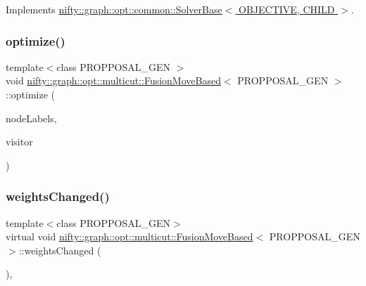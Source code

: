 Implements \hyperlink{classnifty_1_1graph_1_1opt_1_1common_1_1SolverBase_a55e9eb645c07d6e0782ebfb990ab3c84}{nifty\+::graph\+::opt\+::common\+::\+Solver\+Base$<$ O\+B\+J\+E\+C\+T\+I\+V\+E, C\+H\+I\+L\+D $>$}.

\mbox{\label{classnifty_1_1graph_1_1opt_1_1multicut_1_1FusionMoveBased_a4d49383fec48f42f7cba00268e0a59b9}} 
\subsubsection{\texorpdfstring{optimize()}{optimize()}}
{\footnotesize\ttfamily template$<$class P\+R\+O\+P\+P\+O\+S\+A\+L\+\_\+\+G\+EN $>$ \\
void \hyperlink{classnifty_1_1graph_1_1opt_1_1multicut_1_1FusionMoveBased}{nifty\+::graph\+::opt\+::multicut\+::\+Fusion\+Move\+Based}$<$ P\+R\+O\+P\+P\+O\+S\+A\+L\+\_\+\+G\+EN $>$\+::optimize (\begin{DoxyParamCaption}\item[{\hyperlink{classnifty_1_1graph_1_1opt_1_1multicut_1_1FusionMoveBased_aba413de6d17c8728f09126c45e621cdd}{Node\+Labels\+Type} \&}]{node\+Labels,  }\item[{\hyperlink{classnifty_1_1graph_1_1opt_1_1common_1_1SolverBase_ad9932afb08dd17d375de4b15da9ffaa6}{Visitor\+Base\+Type} $\ast$}]{visitor }\end{DoxyParamCaption})\hspace{0.3cm}{\ttfamily [virtual]}}

\mbox{\label{classnifty_1_1graph_1_1opt_1_1multicut_1_1FusionMoveBased_acf62cb1de04c57534601efaff463af0f}} 
\subsubsection{\texorpdfstring{weights\+Changed()}{weightsChanged()}}
{\footnotesize\ttfamily template$<$class P\+R\+O\+P\+P\+O\+S\+A\+L\+\_\+\+G\+EN$>$ \\
virtual void \hyperlink{classnifty_1_1graph_1_1opt_1_1multicut_1_1FusionMoveBased}{nifty\+::graph\+::opt\+::multicut\+::\+Fusion\+Move\+Based}$<$ P\+R\+O\+P\+P\+O\+S\+A\+L\+\_\+\+G\+EN $>$\+::weights\+Changed (\begin{DoxyParamCaption}{ }\end{DoxyParamCaption})\hspace{0.3cm}{\ttfamily [inline]}, {\ttfamily [virtual]}}



